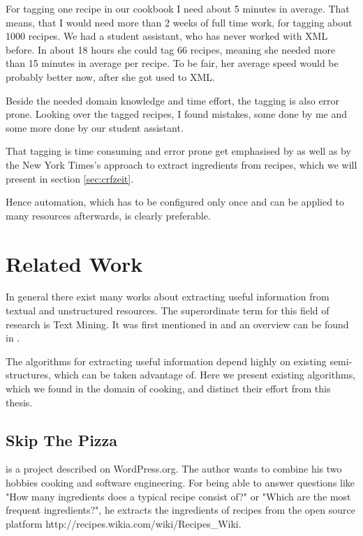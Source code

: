 \documentclass[12pt, twoside]{report}
\begin{document}
For tagging one recipe in our cookbook I need about 5 minutes in average. That means, that I would need more than 2 weeks of full time work, for tagging about 1000 recipes. We had a student assistant, who has never worked with XML before. In about 18 hours she could tag 66 recipes, meaning she needed more than 15 minutes in average per recipe. To be fair, her average speed would be probably better now, after she got used to XML.

Beside the needed domain knowledge and time effort, the tagging is also error prone. Looking over the tagged recipes, I found mistakes, some done by me and some more done by our student assistant.

That tagging is time consuming and error prone get emphasised by \parencite{manualTagging} as well as by the New York Times's approach to extract ingredients from recipes, which we will present in section \ref{sec:crfzeit}.

Hence automation, which has to be configured only once and can be applied to many resources afterwards, is clearly preferable.



\chapter{Related Work}
In general there exist many works about extracting useful information from textual and unstructured resources. The superordinate term for this field of research is Text Mining. It was first mentioned in \parencite{KDT} and an overview can be found in \parencite{surveyOfTextMining}. 

The algorithms for extracting useful information depend highly on existing semi-structures, which can be taken advantage of. Here we present existing algorithms, which we found in the domain of cooking, and distinct their effort from this thesis.

\section{Skip The Pizza}
\parencite{REgutGenug} is a project described on WordPress.org. The author wants to combine his two hobbies cooking and software engineering. For being able to answer questions like "How many ingredients does a typical recipe consist of?" or "Which are the most frequent ingredients?", he extracts the ingredients of recipes from the open source platform http://recipes.wikia.com/wiki/Recipes\_Wiki.
\end{document}
